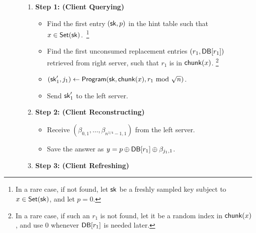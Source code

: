 \begin{figure}[p]
\begin{minipage}{\textwidth}
\begin{mdframed}
            
            
            \begin{enumerate}[leftmargin=5mm,itemsep=1pt]
                \item 
                {\bf Step 1: (Client Querying)}

                \begin{itemize}[leftmargin=5mm,itemsep=1pt]
                        \item Find the first entry $(\mathsf{sk},p)$ in the hint table such that $x\in \mathsf{Set}(\mathsf{sk})$.~\footnote{
In a rare case, if not found, let $\mathsf{sk}$ be a freshly sampled \ppps key subject
to $x \in \mathsf{Set}(\mathsf{sk})$, 
and let $p = 0$.}
\item 
Find the first unconsumed 
replacement entries  
$(r_1, \mathsf{DB}[r_1])$ retrieved from right server,
such that $r_1$ is in $\mathsf{chunk}(x)$.
\footnote{In a rare case, if such an $r_1$ is not found, let it be a random
index in $\mathsf{chunk}(x)$, and use $0$ whenever $\mathsf{DB}[r_1]$ is needed later.} 
                        \item $(\mathsf{sk}_1',j_1)\gets\mathsf{Program}(\mathsf{sk},\mathsf{chunk}(x),r_1\text{ mod } \sqrt{n})$.
                        \item 
                        Send $\mathsf{sk}'_1$ to the left server.     
                \end{itemize}

                \item
               {\bf Step 2: (Client Reconstructing)}
               \begin{itemize}[leftmargin=5mm,itemsep=1pt]
                   \item Receive $(\beta_{0,1},\ldots,\beta_{n^{1/4}-1,1})$ from the left server.
                   \item Save the answer as $y=p\oplus  \mathsf{DB}[r_1]\oplus\beta_{j_1,1}$.
               \end{itemize}
               
                \item
               {\bf Step 3: (Client Refreshing)}
               \begin{itemize}[leftmargin=5mm,itemsep=1pt]
                   

\end{itemize}
\end{enumerate}
\end{mdframed}
\end{minipage}
\end{figure}
